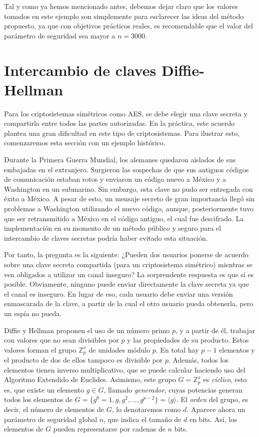     \begin{observacion}
        Tal y como ya hemos mencionado antes, debemos dejar claro que los valores tomados en este ejemplo son simplemente para esclarecer las ideas del método propuesto, ya que con objetivos prácticos reales, es recomendable que el valor del parámetro de seguridad sea mayor a $n = 3000$.
    \end{observacion}

    \section{Intercambio de claves Diffie-Hellman}

    Para los criptosistemas simétricos como AES, se debe elegir una clave secreta y compartirla entre todos las partes autorizadas. En la práctica, este acuerdo plantea una gran dificultad en este tipo de criptosistemas. Para ilustrar esto, comenzaremos esta sección con un ejemplo histórico.

    Durante la Primera Guerra Mundial, los alemanes quedaron aislados de sus embajadas en el extranjero. Surgieron las sospechas de que sus antiguos códigos de comunicación estaban rotos y enviaron un código nuevo a México y a Washington en un submarino. Sin embargo, esta clave no pudo ser entregada con éxito a México. A pesar de esto, un mensaje secreto de gran importancia llegó sin problemas a Washington utilizando el nuevo código, aunque, posteriormente tuvo que ser retransmitido a México en el código antiguo, el cual fue descifrado. La implementación en su momento de un método público y seguro para el intercambio de claves secretas podría haber evitado esta situación.

    Por tanto, la pregunta es la siguiente: ¿Pueden dos usuarios ponerse de acuerdo sobre una clave secreta compartida (para un criptosistema simétrico) mientras se ven obligados a utilizar un canal inseguro? La sorprendente respuesta es que sí es posible. Obviamente, ninguno puede enviar directamente la clave secreta ya que el canal es inseguro. En lugar de eso, cada usuario debe enviar una versión enmascarada de la clave, a partir de la cual el otro usuario pueda obtenerla, pero un espía no pueda.

    Diffie y Hellman proponen el uso de un número primo $p$, y a partir de él, trabajar con valores que no sean divisibles por $p$ y las propiedades de su producto. Estos valores forman el grupo $\mathbb{Z}_{p}^{x}$ de unidades módulo $p$. En total hay $p - 1$ elementos y el producto de dos de ellos tampoco es divisible por $p$. Además, todos los elementos tienen inverso multiplicativo, que se puede calcular haciendo uso del Algoritmo Extendido de Euclides. Asimismo, este grupo $G = \mathbb{Z}_{p}^{x}$ es \textit{cíclico}, esto es, que existe un elemento $g \in G$, llamado \textit{generador}, cuyas potencias generan todos los elementos de $G = \{g^{0} = 1, g, g^{2}, ... , g^{p-2}\} = \langle g \rangle$. El \textit{orden} del grupo, es decir, el número de elementos de $G$, lo denotaremos como $d$. Aparece ahora un parámetro de seguridad global $n$, que indica el tamaño de $d$ en bits. Así, los elementos de $G$ pueden representarse por cadenas de $n$ bits.

